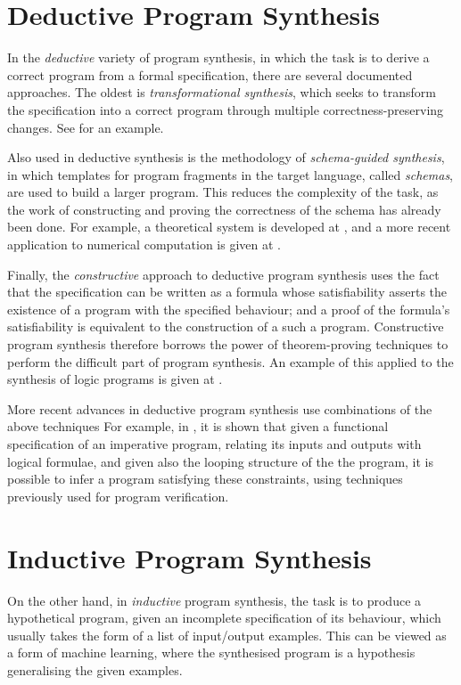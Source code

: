 \documentclass[a4paper,twoside,notitlepage]{report}
\begin{document}
\section{Deductive Program Synthesis}

In the \emph{deductive} variety of program synthesis, in which the task is to 
derive a correct program from a formal specification, there are several 
documented approaches. The oldest is \emph{transformational synthesis}, which 
seeks to transform the specification into a correct program through multiple 
correctness-preserving changes. See \cite{cheatham86} for an example.

Also used in deductive synthesis is the methodology of \emph{schema-guided 
synthesis}, in which templates for program fragments in the target language, 
called \emph{schemas}, are used to build a larger program. This reduces the 
complexity of the task, as the work of constructing and proving the 
correctness of the schema has already been done. For example, a theoretical 
system is developed at \cite{flener97}, and a more recent application to 
numerical computation is given at \cite{colon05}.

Finally, the \emph{constructive} approach to deductive program synthesis uses 
the fact that the specification can be written as a formula whose 
satisfiability asserts the existence of a program with the specified 
behaviour; and a proof of the formula's satisfiability is equivalent to the 
construction of a such a program. Constructive program synthesis therefore 
borrows the power of theorem-proving techniques to perform the difficult part 
of program synthesis. An example of this applied to the synthesis of logic 
programs is given at \cite{bundy90}.

More recent advances in deductive program synthesis use combinations of the 
above techniques For example, in \cite{popl10syn}, it is shown that given a 
functional specification of an imperative program, relating its inputs and 
outputs with logical formulae, and given also the looping structure of the the 
program, it is possible to infer a program satisfying these constraints, using 
techniques previously used for program verification.

\section{Inductive Program Synthesis}

On the other hand, in \emph{inductive} program synthesis, the task is to 
produce a hypothetical program, given an incomplete specification of its 
behaviour, which usually takes the form of a list of input/output examples. 
This can be viewed as a form of machine learning, where the synthesised 
program is a hypothesis generalising the given examples.
\end{document}
